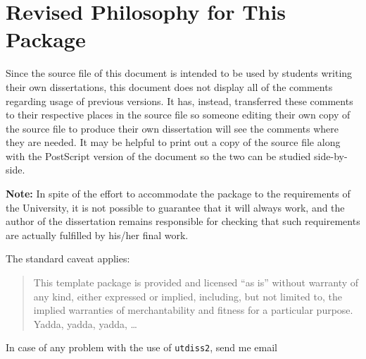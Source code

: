 \section{Revised Philosophy for This Package}
%

Since the source file of this document is intended to be used by students
writing their own dissertations, this document does not display all of the
comments regarding usage of previous versions. It has, instead, transferred
these comments to their respective places in the source file so someone
editing their own copy of the source file to produce their own dissertation
will see the comments where they are needed. It may be helpful to print out
a copy of the source file along with the PostScript version of the document
so the two can be studied side-by-side.

\textbf{Note:} In spite of the effort to accommodate the package to
the requirements of the University, it is not possible to guarantee
that it will always work, and the author of the dissertation remains
responsible for checking that such requirements are actually fulfilled
by his/her final work. 

The standard caveat applies:

\begin{quote}
%
This template package is provided and licensed ``as is'' without warranty
of any kind, either expressed or implied, including, but not limited to,
the implied warranties of merchantability and fitness for a particular
purpose. Yadda, yadda, yadda, \ldots
\end{quote}

In case of any problem with the use of \texttt{utdiss2}, send me email
